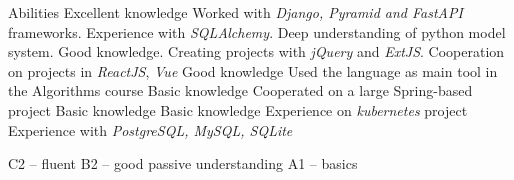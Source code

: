 \begin{rubric}{Abilities}
\entry*[Python]
	Excellent knowledge\newline
    Worked with \textit{Django, Pyramid and FastAPI} frameworks. Experience with
    \textit{SQLAlchemy}. Deep understanding of python model system.
\entry*[JavaScript]
    Good knowledge. Creating projects with \textit{jQuery} and \textit{ExtJS}.
    Cooperation on projects in \textit{ReactJS}, \textit{Vue}
\entry*[C++]
    Good knowledge\newline
    Used the language as main tool in the Algorithms course
\entry*[Java]
    Basic knowledge\newline
    Cooperated on a large Spring-based project
\entry*[Scala]
    Basic knowledge
\entry*[Go]
    Basic knowledge\newline
    Experience on \textit{kubernetes} project
\entry*[Databases]
    Experience with \textit{PostgreSQL, MySQL, SQLite}

\entry*[English]
    C2 -- fluent
\entry*[Russian]
    B2 -- good passive understanding
\entry*[Spanish]
    A1 -- basics
\end{rubric}
